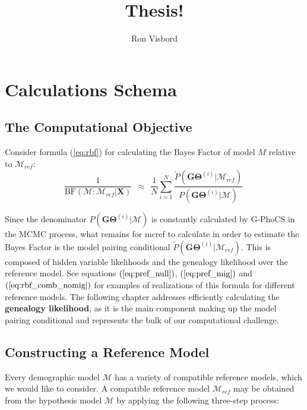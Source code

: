 \documentclass[11pt]{article}
\author{Ron Visbord}
\title{Thesis!}
\newcommand{\vect}[1]{\boldsymbol{\mathbf{#1}}}
\newcommand{\X}{\vect{X}}
\newcommand{\M}{\mathcal{M}}
\newcommand{\G}{\vect{G}}
\newcommand{\T}{\vect{\Theta}}
\newcommand{\GT}{\G\T}
\newcommand{\Mref}{\M_{ref}}
\newcommand{\Pref}{\widetilde{P}}
\newcommand{\rbf}{\text{BF}}
\newcommand{\1}{\mathbbm{1}}
\newcommand{\gp}{G-PhoCS }
\begin{document}
\maketitle


\section{Calculations Schema}


\subsection{The Computational Objective}

Consider formula (\ref{eq:rbf}) for calculating the Bayes Factor of model $M$ relative to $\Mref$:
%
%
\begin{equation}
 \frac{1}{\rbf(\M:\Mref|\X)}  ~~\approx~~ \frac{1}{N} \sum_{i=1}^{N}\frac{\Pref(\GT^{(i)}|\Mref) }{P(\GT^{(i)}|\M)} ~ 
\end{equation}

Since the denominator $P(\GT^{(i)}|\M)$ is constantly calculated by \gp in the MCMC process, what remains for mcref to calculate in order to estimate the Bayes Factor is the model pairing conditional $\Pref(\GT^{(i)}|\Mref)$. This is composed of hidden variable likelihoods and the genealogy likelihood over the reference model. See equations $(\ref{eq:pref_null})$, $(\ref{eq:pref_mig})$ and $(\ref{eq:rbf_comb_nomig})$ for examples of realizations of this formula for different reference models. The following chapter addresses efficiently calculating the \textbf{genealogy likelihood}, as it is the main component making up the model pairing conditional and represents the bulk of our computational challenge.\\

\subsection{Constructing a Reference Model}  \label{Constructing a Reference Model}


Every demographic model $\M$ has a variety of compatible reference models, which we would like to consider. A compatible reference model $\Mref$ may be obtained from the hypothesis model $\M$ by applying the following three-step process:
\end{document}
